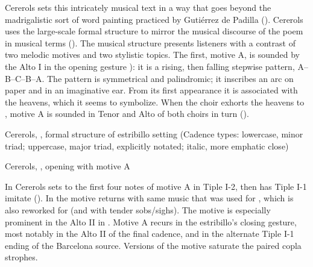 Cererols sets this intricately musical text in a way that goes beyond the
madrigalistic sort of word painting practiced by Gutiérrez de Padilla
().
Cererols uses the large-scale formal structure to mirror the musical discourse
of the poem in musical terms ().
The musical structure presents listeners with a contrast of two melodic motives
and two stylistic topics.
The first, motive A, is sounded by the Alto I in the opening gesture
): it is a rising, then falling
stepwise pattern, A--B--C--B--A.
The pattern is symmetrical and palindromic; it inscribes an arc on paper and
in an imaginative ear.
From its first appearance it is associated with the heavens, which it seems to
symbolize.
When the choir exhorts the heavens to , motive A is
sounded in Tenor and Alto of both choirs in turn ().


\begin{table}
    \caption
    [Cererols, , formal structure of
    estribillo setting]
    {Cererols, , formal structure of estribillo
    setting (Cadence types: lowercase, minor triad; uppercase, major triad,
    explicitly notated; italic, more emphatic close)}
    
    \label{tab:cererols-structure}
\end{table}

\begin{musicexample}
    \caption{Cererols, , opening with motive A}
    \label{mus:Cererols-Suspended-opening} 
\end{musicexample}

In  Cererols sets  to the
first four notes of motive A in Tiple I-2, then has Tiple I-1 imitate
().
In  the motive returns with same music that was used for
, which is also reworked for  (and with tender sobs/sighs).
The motive is especially prominent in the Alto II in .
Motive A recurs in the estribillo's closing gesture, most notably in the Alto II
of the final cadence, and in the alternate Tiple I-1 ending of the Barcelona
source.
Versions of the motive saturate the paired copla strophes.

